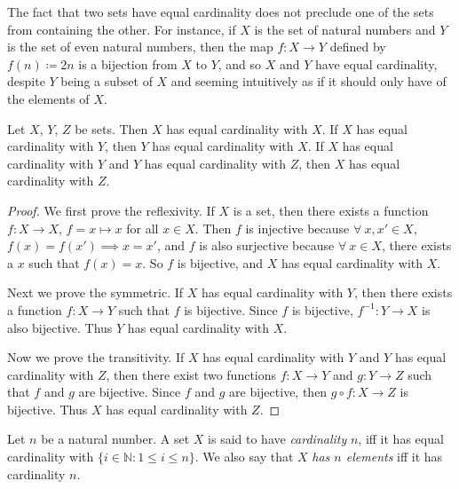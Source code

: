 \begin{remark}
The fact that two sets have equal cardinality does not preclude one of the sets from containing the other.
For instance, if \(X\) is the set of natural numbers and \(Y\) is the set of even natural numbers, then the map \(f : X \to Y\) defined by \(f(n) \coloneqq 2n\) is a bijection from \(X\) to \(Y\), and so \(X\) and \(Y\) have equal cardinality, despite \(Y\) being a subset of \(X\) and seeming intuitively as if it should only have  of the elements of \(X\).
\end{remark}

\begin{proposition}
Let \(X\), \(Y\), \(Z\) be sets.
Then \(X\) has equal cardinality with \(X\).
If \(X\) has equal cardinality with \(Y\), then \(Y\) has equal cardinality with \(X\).
If \(X\) has equal cardinality with \(Y\) and \(Y\) has equal cardinality with \(Z\), then \(X\) has equal cardinality with \(Z\).
\end{proposition}

\begin{proof}
We first prove the reflexivity.
If \(X\) is a set, then there exists a function \(f : X \to X\), \(f = x \mapsto x\) for all \(x \in X\).
Then \(f\) is injective because \(\forall\ x, x' \in X\), \(f(x) = f(x') \implies x = x'\), and \(f\) is also surjective because \(\forall\ x \in X\), there exists a \(x\) such that \(f(x) = x\).
So \(f\) is bijective, and \(X\) has equal cardinality with \(X\).

Next we prove the symmetric.
If \(X\) has equal cardinality with \(Y\), then there exists a function \(f : X \to Y\) such that \(f\) is bijective.
Since \(f\) is bijective, \(f^{-1} : Y \to X\) is also bijective.
Thus \(Y\) has equal cardinality with \(X\).

Now we prove the transitivity.
If \(X\) has equal cardinality with \(Y\) and \(Y\) has equal cardinality with \(Z\), then there exist two functions \(f : X \to Y\) and \(g : Y \to Z\) such that \(f\) and \(g\) are bijective.
Since \(f\) and \(g\) are bijective, then \(g \circ f : X \to Z\) is bijective.
Thus \(X\) has equal cardinality with \(Z\).
\end{proof}

\begin{definition}\label{definition 3.6.2}
Let \(n\) be a natural number.
A set \(X\) is said to have \emph{cardinality} \(n\), iff it has equal cardinality with \(\{i \in \mathds{N} : 1 \leq i \leq n\}\).
We also say that \(X\) \emph{has \(n\) elements} iff it has cardinality \(n\).
\end{definition}


